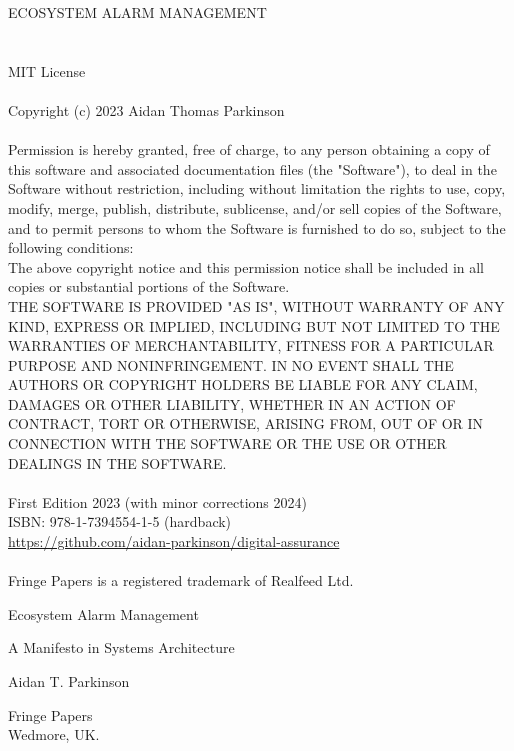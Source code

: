 \documentclass[11pt, oneside]{book}   	%
\begin{document}

\begin{center}
\vspace*{50mm}
ECOSYSTEM ALARM MANAGEMENT
\end{center}

\pagebreak

\section*{}
\begin{small}
	MIT License\\
	\\
	Copyright (c) 2023 Aidan Thomas Parkinson\\
	\\
	Permission is hereby granted, free of charge, to any person obtaining a copy of this software and associated documentation files (the "Software"), to deal in the Software without restriction, including without limitation the rights to use, copy, modify, merge, publish, distribute, sublicense, and/or sell copies of the Software, and to permit persons to whom the Software is furnished to do so, subject to the following conditions:\\
	The above copyright notice and this permission notice shall be included in all copies or substantial portions of the Software.\\
	THE SOFTWARE IS PROVIDED "AS IS", WITHOUT WARRANTY OF ANY KIND, EXPRESS OR IMPLIED, INCLUDING BUT NOT LIMITED TO THE WARRANTIES OF MERCHANTABILITY, FITNESS FOR A PARTICULAR PURPOSE AND NONINFRINGEMENT. IN NO EVENT SHALL THE AUTHORS OR COPYRIGHT HOLDERS BE LIABLE FOR ANY CLAIM, DAMAGES OR OTHER LIABILITY, WHETHER IN AN ACTION OF CONTRACT, TORT OR OTHERWISE, ARISING FROM, OUT OF OR IN CONNECTION WITH THE SOFTWARE OR THE USE OR OTHER DEALINGS IN THE SOFTWARE.\\
	\\
	First Edition 2023 (with minor corrections 2024)\\
	ISBN: 978-1-7394554-1-5 (hardback)\\
	\url{https://github.com/aidan-parkinson/digital-assurance}\\
	\\
	Fringe Papers is a registered trademark of Realfeed Ltd.
\end{small}

\pagebreak

\begin{titlepage}
	\centering
    \vspace*{20mm}
	{\huge Ecosystem Alarm Management\par}
    \vspace{0.5cm}
    {\Large A Manifesto in Systems Architecture\par}
    \vspace{0.5cm}
	{\large Aidan T. Parkinson\par}
	\vfill
	{\large
		\begin{center}
		Fringe Papers\\
		Wedmore, UK.
		\end{center}
	}
\end{titlepage}
\end{document}
